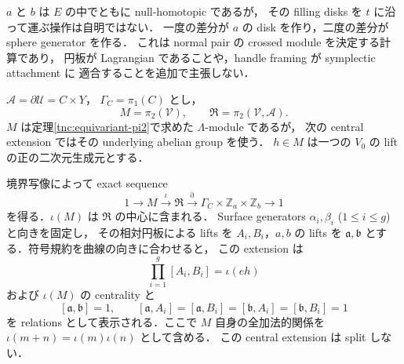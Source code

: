 \begin{remark}
$a$ と $b$ は $E$ の中でともに null-homotopic であるが，
その filling disks を $t$ に沿って運ぶ操作は自明ではない．
一度の差分が $a$ の disk を作り，二度の差分が sphere generator を作る．
これは normal pair の crossed module を決定する計算であり，
円板が Lagrangian であることや，handle framing が symplectic attachment に
適合することを追加で主張しない．
\end{remark}

$\mathcal A=\partial\mathcal U=C\times Y$，
$\Gamma_C=\pi_1(C)$ とし，
\[
 M=\pi_2(\mathcal V),\qquad
 \mathfrak R=\pi_2(\mathcal V,\mathcal A).
\]
$M$ は定理\ref{tnc:equivariant-pi2}で求めた $\Lambda$-module であるが，
次の central extension ではその underlying abelian group を使う．
$h\in M$ は一つの $V_0$ の lift の正の二次元生成元とする．

\begin{theorem}
\label{tnc:relative-disk-central-extension}
境界写像によって exact sequence
\[
 1\longrightarrow M\xrightarrow{\iota}\mathfrak R
   \xrightarrow{\partial}\Gamma_C\times\mathbb Z_a\times\mathbb Z_b
   \longrightarrow1
\]
を得る．$\iota(M)$ は $\mathfrak R$ の中心に含まれる．
Surface generators $\alpha_i,\beta_i$ ($1\le i\le g$) と向きを固定し，
その相対円板による lifts を $A_i,B_i$，$a,b$ の lifts を
$\mathfrak a,\mathfrak b$ とする．符号規約を曲線の向きに合わせると，
この extension は
\[
 \prod_{i=1}^g[A_i,B_i]=\iota(eh)
\]
および $\iota(M)$ の centrality と
\[
 [\mathfrak a,\mathfrak b]=1,\qquad
 [\mathfrak a,A_i]=[\mathfrak a,B_i]
 =[\mathfrak b,A_i]=[\mathfrak b,B_i]=1
\]
を relations として表示される．ここで $M$ 自身の全加法的関係を
$\iota(m+n)=\iota(m)\iota(n)$ として含める．
この central extension は split しない．
\end{theorem}

